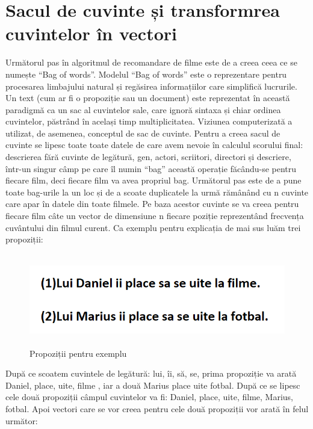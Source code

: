 \section{Sacul de cuvinte și transformrea cuvintelor în vectori }
\par Următorul pas în algoritmul de recomandare de filme este de a creea ceea ce se numește “Bag of words”. Modelul “Bag of words” este o reprezentare pentru procesarea limbajului natural și regăsirea informațiilor care simplifică lucrurile. Un text (cum ar fi o propoziție sau un document) este reprezentat în această paradigmă ca un sac al cuvintelor sale, care ignoră sintaxa și chiar ordinea cuvintelor, păstrând în același timp multiplicitatea. Viziunea computerizată a utilizat, de asemenea, conceptul de sac de cuvinte. Pentru a creea sacul de cuvinte se lipesc toate toate datele de care avem nevoie în calculul scorului final: descrierea fără cuvinte de legătură, gen, actori, scriitori, directori și descriere, într-un singur câmp pe care îl numin “bag” această operație făcându-se pentru fiecare film, deci fiecare film va avea propriul bag. Următorul pas este de a pune toate bag-urile la un loc și de a scoate duplicatele la urmă rămânând cu n cuvinte care apar în datele din toate filmele. Pe baza acestor cuvinte se va creea pentru fiecare film câte un vector de dimensiune n fiecare poziție reprezentând frecvența cuvântului din filmul curent. Ca exemplu pentru explicația de mai sus luăm trei propoziții: 
		\begin{figure}[htbp]
			\centerline{\includegraphics[width=16cm, height=4cm]{figures/cele 2 poze.png}}
			\caption{Propoziții pentru exemplu}
			\label{fig}
		\end{figure}
\par După ce scoatem cuvintele de legătură: lui, îi, să, se, prima propoziție va arată Daniel, place, uite, filme , iar a două Marius place uite fotbal. După ce se lipesc cele două propoziții câmpul cuvintelor va fi: Daniel, place, uite, filme, Marius, fotbal. Apoi vectori care se vor creea pentru cele două propoziții vor arată în felul următor: 

